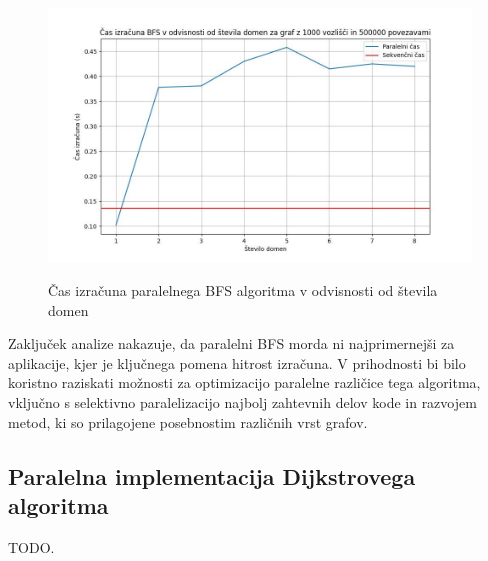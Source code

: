 \documentclass[mat1, tisk]{fmfdelo}
\begin{document}
\begin{figure}[h!]
  \centering
  \caption{Čas izračuna paralelnega BFS algoritma v odvisnosti od števila domen}
  \includegraphics[width=15cm]{slike/bfs_v_odvisnosti_od_stevila_domen.jpg}
  \label{fig:bfs_calculation_time_by_graph_size}
\end{figure}

Zaključek analize nakazuje, da paralelni BFS morda ni najprimernejši za aplikacije, kjer je ključnega pomena hitrost izračuna.
V prihodnosti bi bilo koristno raziskati možnosti za optimizacijo paralelne različice tega algoritma, vključno s
selektivno paralelizacijo najbolj zahtevnih delov kode in razvojem metod, ki so prilagojene posebnostim različnih vrst grafov.

\subsection{Paralelna implementacija Dijkstrovega algoritma} \label{section:dijkstra}

TODO.
\end{document}
